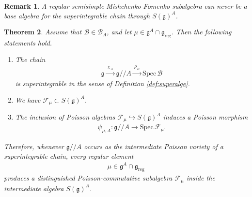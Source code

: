 \documentclass[11pt,reqno]{amsart}
\newtheorem*{theorem A}{Main Theorem A}
\newtheorem*{theorem B}{Main Theorem B}
\newtheorem*{theorem C}{Main Theorem C}
\newtheorem*{theorem D}{Main Theorem D}
\newtheorem{theorem}{Theorem}[section]
\theoremstyle{definition}
\theoremstyle{plain}
\newtheorem{remark}[theorem]{Remark}
\theoremstyle{conclusion}
\begin{document}
\begin{remark}
\label{rmk:mfnotbase}
A regular semisimple Mishchenko-Fomenko subalgebra can never be a base algebra for the superintegrable chain through $S(\mathfrak{g})^A$.
\end{remark}

 

\begin{theorem}
\label{thm:mfinsidesuper}
Assume that $\mathcal{B} \in \mathcal{B}_A$, and let $\mu \in \mathfrak{g}^A \cap \mathfrak{g}_{\mathrm{reg}}$. Then the following statements hold.

\begin{enumerate}
\item The chain
\begin{align*}
\mathfrak{g} \xrightarrow{\ \chi_A\ } \mathfrak{g}//A \xrightarrow{\ \rho_B\ } \mathrm{Spec}\, \mathcal{B}
\end{align*}
is superintegrable in the sense of Definition \ref{def:superalge}.

\item We have $\mathcal{F}_\mu \subset S(\mathfrak{g})^A$. 

\item The inclusion of Poisson algebras $\mathcal{F}_\mu \hookrightarrow S(\mathfrak{g})^A$ induces a Poisson morphism \begin{align*}
\psi_{\mu,A} : \mathfrak{g}//A \longrightarrow \mathrm{Spec}\,\mathcal{F}_\mu.
\end{align*}
\end{enumerate}

Therefore, whenever $\mathfrak{g}//A$ occurs as the intermediate Poisson variety of a superintegrable chain, every regular element
\begin{align*}
\mu \in \mathfrak{g}^A \cap \mathfrak{g}_{\mathrm{reg}}
\end{align*}
produces a distinguished Poisson-commutative subalgebra $\mathcal{F}_\mu$ inside the intermediate algebra $S(\mathfrak{g})^A$.
\end{theorem}
\end{document}
